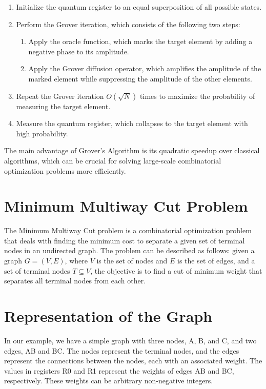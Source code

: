 \begin{enumerate}
    \item Initialize the quantum register to an equal superposition of all possible states.
    \item Perform the Grover iteration, which consists of the following two steps:
    \begin{enumerate}
        \item Apply the oracle function, which marks the target element by adding a negative phase to its amplitude.
        \item Apply the Grover diffusion operator, which amplifies the amplitude of the marked element while suppressing the amplitude of the other elements.
    \end{enumerate}
    \item Repeat the Grover iteration $O(\sqrt{N})$ times to maximize the probability of measuring the target element.
    \item Measure the quantum register, which collapses to the target element with high probability.
\end{enumerate}

The main advantage of Grover's Algorithm is its quadratic speedup over classical algorithms, which can be crucial for solving large-scale combinatorial optimization problems more efficiently.



\section{Minimum Multiway Cut Problem}

The Minimum Multiway Cut problem is a combinatorial optimization problem that deals with finding the minimum cost to separate a given set of terminal nodes in an undirected graph. The problem can be described as follows: given a graph $G = (V, E)$, where $V$ is the set of nodes and $E$ is the set of edges, and a set of terminal nodes $T \subseteq V$, the objective is to find a cut of minimum weight that separates all terminal nodes from each other.

\section{Representation of the Graph}

In our example, we have a simple graph with three nodes, A, B, and C, and two edges, AB and BC. The nodes represent the terminal nodes, and the edges represent the connections between the nodes, each with an associated weight. The values in registers R0 and R1 represent the weights of edges AB and BC, respectively. These weights can be arbitrary non-negative integers.

